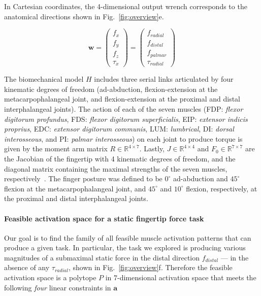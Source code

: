 \documentclass[9pt,twocolumn,twoside,lineno]{pnas-new}
\begin{document}
{In Cartesian coordinates, the 4-dimensional output wrench corresponds to the anatomical directions shown in Fig.~\ref{fig:overview}e.

\begin{equation}
\label{eq:wc}
\textbf{w}=
\begin{pmatrix}
f_{x}\\
f_{y}\\
f_{z}\\
\tau_{x}
\end{pmatrix} =
\begin{pmatrix}
f_{radial}\\
f_{distal}\\
f_{palmar}\\
\tau_{radial}
\end{pmatrix}
\end{equation}




The biomechanical model $H$ includes three serial links articulated by four kinematic degrees of freedom (ad-abduction, flexion-extension at the metacarpophalangeal joint, and flexion-extension at the proximal and distal interphalangeal joints). The action of each of the seven muscles (FDP: \emph{flexor digitorum profundus}, FDS: \emph{flexor digitorum superficialis}, EIP: \emph{extensor indicis proprius}, EDC: \emph{extensor digitorum communis}, LUM: \emph{lumbrical}, DI: \emph{dorsal interosseous}, and PI: \emph{palmar interosseous}) on each joint to produce torque is given by the moment arm matrix $R \in \mathbb{R}^{4 \times 7}$. Lastly, $J \in \mathbb{R}^{4 \times 4}$ and $F_0 \in \mathbb{R}^{7 \times 7}$ are the Jacobian of the fingertip with 4 kinematic degrees of freedom, and the diagonal matrix containing the maximal strengths of the seven muscles, respectively~\cite{valero-cuevas2015fundamentals,Valero-Cuevas2000Scaling}. The finger posture was defined to be $0^\circ$ ad-abduction and $45^\circ$ flexion at the metacarpophalangeal joint, and $45^\circ$ and $10^\circ$ flexion, respectively, at the proximal and distal interphalangeal joints.

\paragraph*{Feasible activation space for a static fingertip force task}

Our goal is to find the family of all feasible muscle activation patterns that can produce a given task. In particular, the task we explored is producing various magnitudes of a submaximal static force in the distal direction $f_{distal}$ --- in the absence of any $\tau_{radial}$, shown in Fig.~\ref{fig:overview}f. Therefore the feasible activation space is a polytope $P$ in 7-dimensional activation space that meets the following \emph{four} linear constraints in $\textbf{a}$~\cite{Valero-Cuevas1998Large,valero-cuevas2015fundamentals,Valero-Cuevas2000Scaling}

}
\end{document}
